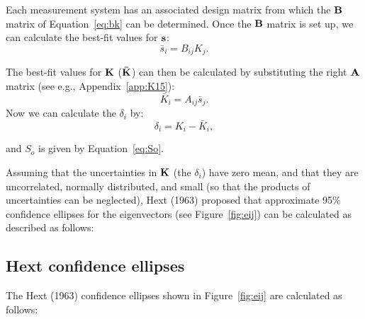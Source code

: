 Each measurement system has an associated design matrix from which the $\hbox{\bf B}$ matrix of Equation~\ref{eq:bk} can be determined.     Once the $\hbox{\bf B}$ matrix  is set up,  we can calculate 
the best-fit values for
$\hbox{\bf s}$:
\begin{equation}
\bar s_i = B_{ij} K_j.
\label{eq:barchi}
\end{equation}

\noindent The best-fit values for $\hbox{\bf K}$ ($\hbox{\bf \=K}$) 
can then be calculated by substituting the right $\hbox{\bf A}$ matrix (see e.g., Appendix~\ref{app:K15}): 
$$
\bar K_i = A_{ij}\bar s_j.
$$
\noindent
Now we can calculate the $\delta_i$ by:
\begin{equation}
\delta_i = K_i-\bar K_i,
\label{eq:deli}
\end{equation}

\noindent and $S_o$ is given by Equation~\ref{eq:So}. 

Assuming that the uncertainties in $\hbox{\bf K}$ (the $\delta_i$)
 have zero mean, and that they are uncorrelated, normally
distributed, and small (so that the products of uncertainties can
be neglected),  Hext (1963) proposed that approximate 95\% confidence
ellipses for the eigenvectors (see Figure~\ref{fig:eij}) can  be calculated as described as follows:

\subsection{Hext confidence ellipses}
\label{sect:hextE}

The Hext (1963) confidence ellipses shown in Figure~\ref{fig:eij} are calculated as follows: 


